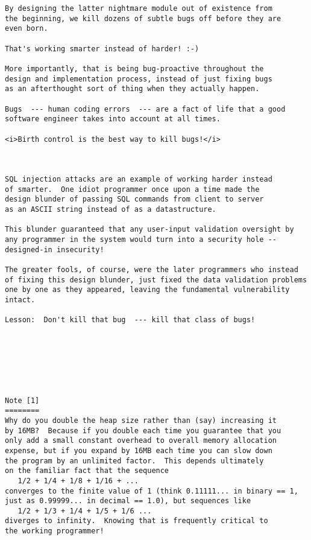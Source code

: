 \begin{verbatim}
By designing the latter nightmare module out of existence from 
the beginning, we kill dozens of subtle bugs off before they are 
even born. 

That's working smarter instead of harder! :-) 

More importantly, that is being bug-proactive throughout the 
design and implementation process, instead of just fixing bugs 
as an afterthought sort of thing when they actually happen. 

Bugs  --- human coding errors  --- are a fact of life that a good 
software engineer takes into account at all times. 

<i>Birth control is the best way to kill bugs!</i> 



SQL injection attacks are an example of working harder instead 
of smarter.  One idiot programmer once upon a time made the 
design blunder of passing SQL commands from client to server 
as an ASCII string instead of as a datastructure. 

This blunder guaranteed that any user-input validation oversight by 
any programmer in the system would turn into a security hole -- 
designed-in insecurity! 

The greater fools, of course, were the later programmers who instead 
of fixing this design blunder, just fixed the data validation problems 
one by one as they appeared, leaving the fundamental vulnerability intact. 

Lesson:  Don't kill that bug  --- kill that class of bugs! 







Note [1] 
======== 
Why do you double the heap size rather than (say) increasing it 
by 16MB?  Because if you double each time you guarantee that you 
only add a small constant overhead to overall memory allocation 
expense, but if you expand by 16MB each time you can slow down 
the program by an unlimited factor.  This depends ultimately 
on the familiar fact that the sequence 
   1/2 + 1/4 + 1/8 + 1/16 + ... 
converges to the finite value of 1 (think 0.11111... in binary == 1, 
just as 0.99999... in decimal == 1.0), but sequences like 
   1/2 + 1/3 + 1/4 + 1/5 + 1/6 ... 
diverges to infinity.  Knowing that is frequently critical to 
the working programmer! 












\end{verbatim}
